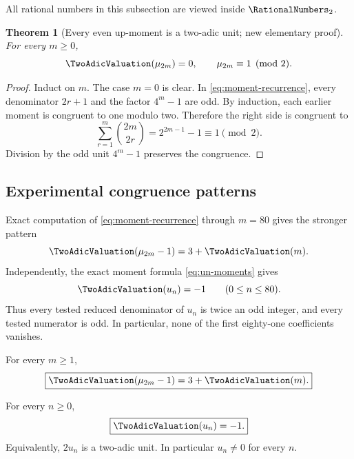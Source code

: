 \documentclass[11pt,oneside]{article}
\numberwithin{equation}{section}
\newtheorem{theorem}{Theorem}[section]
\theoremstyle{definition}
\theoremstyle{remark}
\begin{document}
All rational numbers in this subsection are viewed inside $\RationalNumbers_2$.

\begin{theorem}[Every even up-moment is a two-adic unit; new elementary proof]
\label{thm:moment-units}
For every $m\ge0$,
\begin{equation}
 \TwoAdicValuation(\mu_{2m})=0,
 \qquad
 \mu_{2m}\equiv1\pmod2.
 \label{eq:moment-unit}
\end{equation}
\end{theorem}

\begin{proof}
Induct on $m$.  The case $m=0$ is clear.  In
\eqref{eq:moment-recurrence}, every denominator $2r+1$ and the factor
$4^m-1$ are odd.  By induction, each earlier moment is congruent to one modulo
two.  Therefore the right side is congruent to
\[
 \sum_{r=1}^{m}\binom{2m}{2r}
 =2^{2m-1}-1\equiv1\pmod2.
\]
Division by the odd unit $4^m-1$ preserves the congruence.
\end{proof}

\subsection{Experimental congruence patterns}

Exact computation of \eqref{eq:moment-recurrence} through $m=80$ gives the
stronger pattern
\begin{equation}
 \TwoAdicValuation(\mu_{2m}-1)=3+\TwoAdicValuation(m).
 \label{eq:moment-congruence-pattern}
\end{equation}
Independently, the exact moment formula \eqref{eq:un-moments} gives
\begin{equation}
 \TwoAdicValuation(u_n)=-1
 \qquad(0\le n\le80).
 \label{eq:un-v2-data}
\end{equation}
Thus every tested reduced denominator of $u_n$ is twice an odd integer, and
every tested numerator is odd.  In particular, none of the first eighty-one
coefficients vanishes.

\begin{conjecture}
\label{conj:moment-congruence}
For every $m\ge1$,
\begin{equation}
 \boxed{\TwoAdicValuation(\mu_{2m}-1)=3+\TwoAdicValuation(m).}
 \label{eq:conj-moment}
\end{equation}
\end{conjecture}

\begin{conjecture}
\label{conj:half-integrality}
For every $n\ge0$,
\begin{equation}
 \boxed{\TwoAdicValuation(u_n)=-1.}
 \label{eq:conj-half-integrality}
\end{equation}
Equivalently, $2u_n$ is a two-adic unit.  In particular $u_n\ne0$ for every
$n$.
\end{conjecture}
\end{document}
